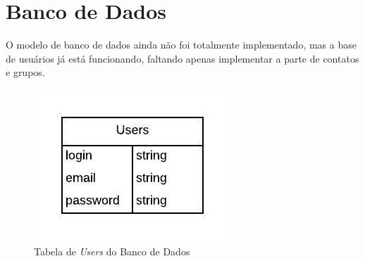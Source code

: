 \documentclass[11pt,a4paper,titlepage]{article}
\begin{document}
\section{Banco de Dados}

O modelo de banco de dados ainda não foi totalmente implementado, mas a base de usuários já está funcionando, faltando apenas implementar a parte de contatos e grupos.
\begin{figure}[!ht]
	\centering
	\includegraphics[scale=0.8]{img/userstable.jpeg}
	\caption{Tabela de \textit{Users} do Banco de Dados}
\end{figure}

\pagebreak
\end{document}
